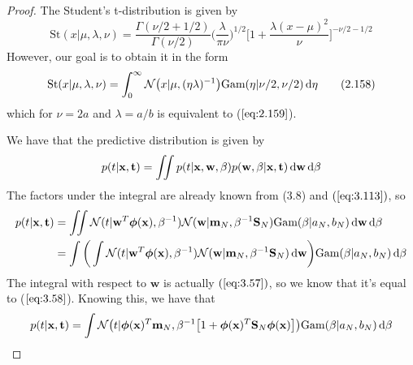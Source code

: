 \vspace{1em}

\begin{proof}
    The Student's t-distribution is given by
    \begin{equation*}
        \text{St}(x | \mu, \lambda, \nu)
        = \frac{\Gamma(\nu/2 + 1/2)}{\Gamma(\nu/2)} \bigg(\frac{\lambda}{\pi \nu}\bigg)^{1/2}
        \bigg[1 + \frac{\lambda(x - \mu)^2}{\nu}\bigg]^{-\nu/2 - 1/2}
        \tag{2.159}\label{eq:2.159}
    \end{equation*}
    However, our goal is to obtain it in the form
    \begin{equation*}
        \text{St}(x | \mu, \lambda, \nu)
        = \int_{0}^{\infty} \mathcal{N}\big(x | \mu, (\eta\lambda)^{-1}\big)
        \text{Gam}(\eta | \nu/2, \nu/2) \mathop{}\!\mathrm{d} \eta
        \tag{2.158}\label{eq:2.158}
    \end{equation*}
    which for $\nu = 2a$ and $\lambda = a/b$ is equivalent to ($\ref{eq:2.159}$). 

    We have that the predictive distribution is given by
    \[
        p(t | \mathbf{x}, \mathbf{t}) 
        = \iint p(t | \mathbf{x}, \mathbf{w}, \beta) p(\mathbf{w}, \beta | \mathbf{x}, \mathbf{t})
        \mathop{}\!\mathrm{d} \mathbf{w} \mathop{}\!\mathrm{d} \beta
    \] 
    The factors under the integral are already known from (3.8) and 
    $(\ref{eq:3.113})$, so
    \begin{align*}
        p(t | \mathbf{x}, \mathbf{t}) 
        &= \iint \mathcal{N}(t | \mathbf{w}^T\bm{\phi}(\mathbf{x}), \beta^{-1}) 
            \mathcal{N}(\mathbf{w} | \mathbf{m}_N, \beta^{-1} \mathbf{S}_N) 
            \text{Gam}(\beta | a_N, b_N)
            \mathop{}\!\mathrm{d} \mathbf{w} \mathop{}\!\mathrm{d} \beta \\
        &= \int \bigg(\int \mathcal{N}(t | \mathbf{w}^T\bm{\phi}(\mathbf{x}), \beta^{-1}) 
            \mathcal{N}(\mathbf{w} | \mathbf{m}_N, \beta^{-1} \mathbf{S}_N) 
            \mathop{}\!\mathrm{d} \mathbf{w}\bigg)
            \text{Gam}(\beta | a_N, b_N)
            \mathop{}\!\mathrm{d} \beta
    \end{align*}
    The integral with respect to $\mathbf{w}$ is actually $(\ref{eq:3.57})$, so
    we know that it's equal to ($\ref{eq:3.58}$). Knowing this, we have that
    \[
        p(t | \mathbf{x}, \mathbf{t}) 
        = \int \mathcal{N}\big(t | \bm{\phi}(\mathbf{x})^T\mathbf{m}_N, 
        \beta^{-1} \big[1 + \bm{\phi}(\mathbf{x})^T\mathbf{S}_N\bm{\phi}(\mathbf{x})\big]\big)
        \text{Gam}(\beta | a_N, b_N) \mathop{}\!\mathrm{d} \beta
    \] 
\end{proof}

